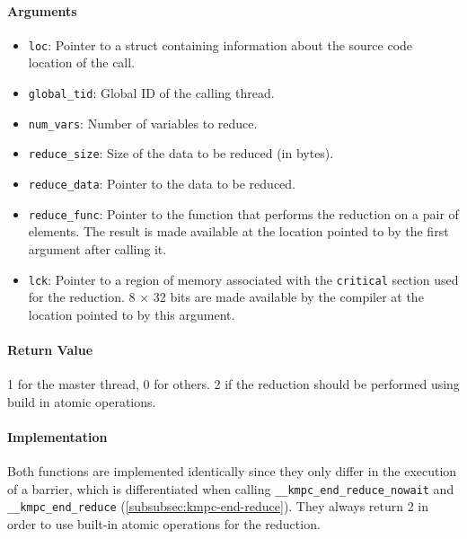 \paragraph{Arguments}
\begin{itemize}
	\item \texttt{loc}: Pointer to a struct containing information about the source code location
	      of the call.
	\item \texttt{global_tid}: Global ID of the calling thread.
	\item \texttt{num\_vars}: Number of variables to reduce.
	\item \texttt{reduce\_size}: Size of the data to be reduced (in bytes).
	\item \texttt{reduce\_data}: Pointer to the data to be reduced.
	\item \texttt{reduce\_func}: Pointer to the function that performs the reduction on a pair of
	      elements. The result is made available at the location pointed to by the first argument
	      after calling it.
	\item \texttt{lck}: Pointer to a region of memory associated with the \texttt{critical} section used for
	      the reduction. 8 $\times$ 32 bits are made available by the compiler at the location pointed
	      to by this argument.
\end{itemize}

\paragraph{Return Value} 1 for the master thread, 0 for others. 2 if the reduction should be
performed using build in atomic operations.

\paragraph{Implementation} Both functions are implemented identically since they only differ in the
execution of a barrier, which is differentiated when calling \texttt{\_\_kmpc\_end\_reduce\_nowait}
and \texttt{\_\_kmpc\_end\_reduce} (\cref{subsubsec:kmpc-end-reduce}). They always return 2 in order
to use built-in atomic operations for the reduction.

